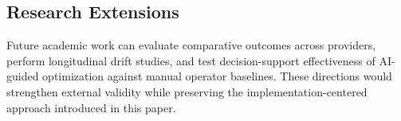 \subsection{Research Extensions}
Future academic work can evaluate comparative outcomes across providers, perform longitudinal drift studies, and test decision-support effectiveness of AI-guided optimization against manual operator baselines. These directions would strengthen external validity while preserving the implementation-centered approach introduced in this paper.
